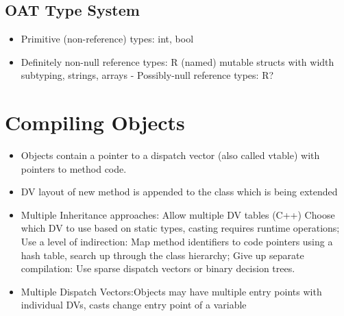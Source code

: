 \subsection*{OAT Type System}
\begin{itemize}
	\item Primitive (non-reference) types: int, bool
	\item Definitely non-null reference types: R (named) mutable structs with width subtyping, strings, arrays - Possibly-null reference types: R?
\end{itemize}
\section*{Compiling Objects}
\begin{itemize}
	\item Objects contain a pointer to a dispatch vector (also called vtable) with pointers to method code. 
	\item DV layout of new method is appended to the class which is being extended
	\item Multiple Inheritance approaches: Allow multiple DV tables (C++) Choose which DV to use based on static types, casting requires runtime operations; Use a level of indirection: Map method identifiers to code pointers using a hash table, search up through the class hierarchy; Give up separate compilation: Use sparse dispatch vectors or binary decision trees.
	\item Multiple Dispatch Vectors:Objects may have multiple entry points with individual DVs, casts change entry point of a variable
\end{itemize}


